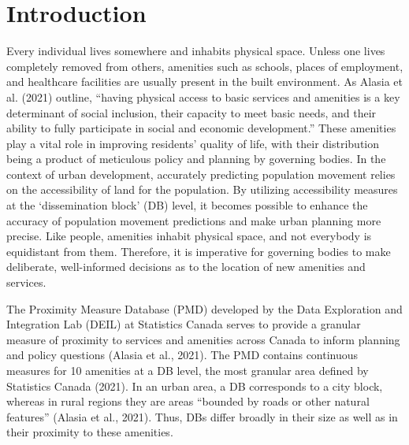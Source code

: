 \documentclass[11pt, a4paper]{article}
\begin{document}
\section{Introduction}
\par
Every individual lives somewhere and inhabits physical space. Unless one lives completely removed from others, amenities such as schools, places of employment, and healthcare facilities are usually present in the built environment. As Alasia et al. (2021) outline, ``having physical access to basic services and amenities is a key determinant of social inclusion, their capacity to meet basic needs, and their ability to fully participate in social and economic development.'' These amenities play a vital role in improving residents' quality of life, with their distribution being a product of meticulous policy and planning by governing bodies. In the context of urban development, accurately predicting population movement relies on the accessibility of land for the population. By utilizing accessibility measures at the `dissemination block' (DB) level, it becomes possible to enhance the accuracy of population movement predictions and make urban planning more precise. Like people, amenities inhabit physical space, and not everybody is equidistant from them. Therefore, it is imperative for governing bodies to make deliberate, well-informed decisions as to the location of new amenities and services.
\par
The Proximity Measure Database (PMD) developed by the Data Exploration and Integration Lab (DEIL) at Statistics Canada serves to provide a granular measure of proximity to services and amenities across Canada to inform planning and policy questions (Alasia et al., 2021). The PMD contains continuous measures for 10 amenities at a DB level, the most granular area defined by Statistics Canada (2021). In an urban area, a DB corresponds to a city block, whereas in rural regions they are areas ``bounded by roads or other natural features'' (Alasia et al., 2021). Thus, DBs differ broadly in their size as well as in their proximity to these amenities.
\par
\end{document}
